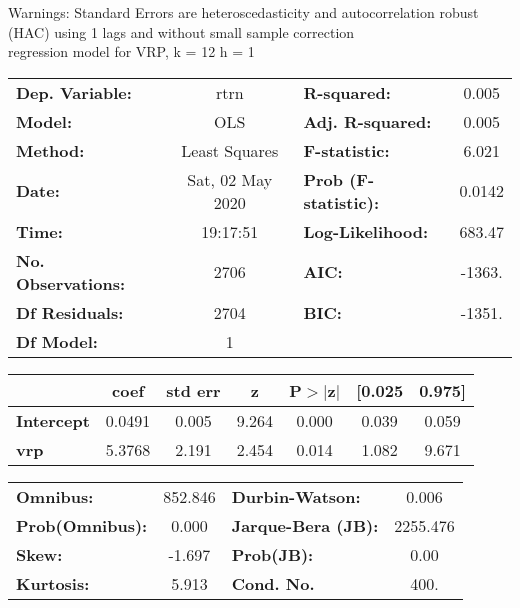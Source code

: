 Warnings: \newline
 [1] Standard Errors are heteroscedasticity and autocorrelation robust (HAC) using 1 lags and without small sample correction\\ 

regression model for VRP, k = 12 h = 1\begin{center}
\begin{tabular}{lclc}
\toprule
\textbf{Dep. Variable:}    &       rtrn       & \textbf{  R-squared:         } &     0.005   \\
\textbf{Model:}            &       OLS        & \textbf{  Adj. R-squared:    } &     0.005   \\
\textbf{Method:}           &  Least Squares   & \textbf{  F-statistic:       } &     6.021   \\
\textbf{Date:}             & Sat, 02 May 2020 & \textbf{  Prob (F-statistic):} &   0.0142    \\
\textbf{Time:}             &     19:17:51     & \textbf{  Log-Likelihood:    } &    683.47   \\
\textbf{No. Observations:} &        2706      & \textbf{  AIC:               } &    -1363.   \\
\textbf{Df Residuals:}     &        2704      & \textbf{  BIC:               } &    -1351.   \\
\textbf{Df Model:}         &           1      & \textbf{                     } &             \\
\bottomrule
\end{tabular}
\begin{tabular}{lcccccc}
                   & \textbf{coef} & \textbf{std err} & \textbf{z} & \textbf{P$> |$z$|$} & \textbf{[0.025} & \textbf{0.975]}  \\
\midrule
\textbf{Intercept} &       0.0491  &        0.005     &     9.264  &         0.000        &        0.039    &        0.059     \\
\textbf{vrp}       &       5.3768  &        2.191     &     2.454  &         0.014        &        1.082    &        9.671     \\
\bottomrule
\end{tabular}
\begin{tabular}{lclc}
\textbf{Omnibus:}       & 852.846 & \textbf{  Durbin-Watson:     } &    0.006  \\
\textbf{Prob(Omnibus):} &   0.000 & \textbf{  Jarque-Bera (JB):  } & 2255.476  \\
\textbf{Skew:}          &  -1.697 & \textbf{  Prob(JB):          } &     0.00  \\
\textbf{Kurtosis:}      &   5.913 & \textbf{  Cond. No.          } &     400.  \\
\bottomrule
\end{tabular}
\end{center}

